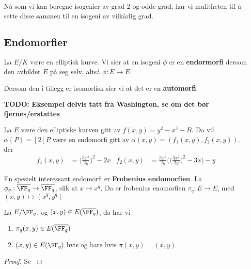 Nå som vi kan beregne isogenier av grad 2 og odde grad, har vi mulitheten til å sette disse sammen til en isogeni av vilkårlig grad.


\subsection{Endomorfier}

\begin{definisjon}
La $E/K$ være en elliptisk kurve. Vi sier at en isogeni $\phi$ er en \textbf{endormorfi }dersom den avbilder $E$ på seg selv, altså $\phi: E \rightarrow E$.

Dersom den i tillegg er isomorfisk sier vi at det er en \textbf{automorfi}.
\end{definisjon}



\textbf{TODO: Eksempel delvis tatt fra Washington, se om det bør fjernes/erstattes}
\begin{eksempel}
\label{enkel_endormorfi}
La $E$ være den elliptiske kurven gitt av $f(x,y) = y^2 - x^3 - B$. Da vil $\alpha(P) = [2]P$ være en endomorfi gitt av $\alpha(x,y) = (f_1(x,y), f_2(x,y))$, der 
\begin{align*}
f_1(x,y) &= \Big(\frac{3x^2}{2y} \Big)^2 - 2x & f_2(x,y) &= \frac{3x^2}{2y}\bigg(\Big(\frac{3x^2}{2y} \Big)^2 - 3x\bigg) - y 
\end{align*}
\end{eksempel}

En spesielt interessant endomorfi er \textbf{Frobenius endomorfien}. La $\phi_q : \overline{\FF_q} \rightarrow \overline{\FF_q}$, slik at $x \mapsto x^q$. Da er frobenius enomorfien $\pi_q: E \rightarrow E$, med $(x,y) \mapsto (x^q, y^q)$

\begin{lemma}
La $E/\FF_q$, og $(x,y) \in E(\overline{\FF_q})$, da har vi \begin{enumerate}
\item $\pi_q(x,y) \in E(\overline{\FF_q})$
\item $(x,y) \in E(\FF_q)$ hvis og bare hvis $\pi(x,y) = (x,y)$
\end{enumerate}

\begin{proof}
Se \cite[93, 4.5]{washington}
\end{proof}
\end{lemma}
